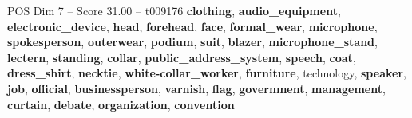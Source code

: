 \begin{textsample}{POS Dim 7 – Score 31.00 – t009176}  \label{ex:f7_pos_003}
\textbf{clothing}, \textbf{audio\_equipment}, \textbf{electronic\_device}, \textbf{head}, \textbf{forehead}, \textbf{face}, \textbf{formal\_wear}, \textbf{microphone}, \textbf{spokesperson}, \textbf{outerwear}, \textbf{podium}, \textbf{suit}, \textbf{blazer}, \textbf{microphone\_stand}, \textbf{lectern}, \textbf{standing}, \textbf{collar}, \textbf{public\_address\_system}, \textbf{speech}, \textbf{coat}, \textbf{dress\_shirt}, \textbf{necktie}, \textbf{white-collar\_worker}, \textbf{furniture}, technology, \textbf{speaker}, \textbf{job}, \textbf{official}, \textbf{businessperson}, \textbf{varnish}, \textbf{flag}, \textbf{government}, \textbf{management}, \textbf{curtain}, \textbf{debate}, \textbf{organization}, \textbf{convention}

\end{textsample}
